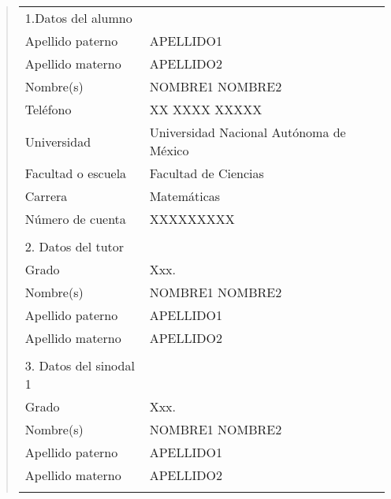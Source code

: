 \begin{quote}
\begin{tabular}{lll}
%
1.Datos del alumno           &                                         \\
Apellido paterno             & APELLIDO1                               \\
Apellido materno             & APELLIDO2                               \\
Nombre(s)                    & NOMBRE1 NOMBRE2                         \\
Teléfono                     & XX XXXX XXXXX                           \\
Universidad                  & Universidad Nacional Autónoma de México \\
Facultad o escuela           & Facultad de Ciencias                    \\
Carrera                      & Matemáticas                             \\
Número de cuenta             & XXXXXXXXX                               \\
                             &                                         \\
%
2. Datos del tutor           &                                         \\
Grado                        & Xxx.                                    \\
Nombre(s)                    & NOMBRE1 NOMBRE2                         \\
Apellido paterno             & APELLIDO1                               \\
Apellido materno             & APELLIDO2                               \\
                             &                                         \\
%
3. Datos del sinodal 1       &                                         \\
Grado                        & Xxx.                                    \\
Nombre(s)                    & NOMBRE1 NOMBRE2                         \\
Apellido paterno             & APELLIDO1                               \\
Apellido materno             & APELLIDO2                               \\
                             &                                         \\

\end{tabular}
\end{quote}
